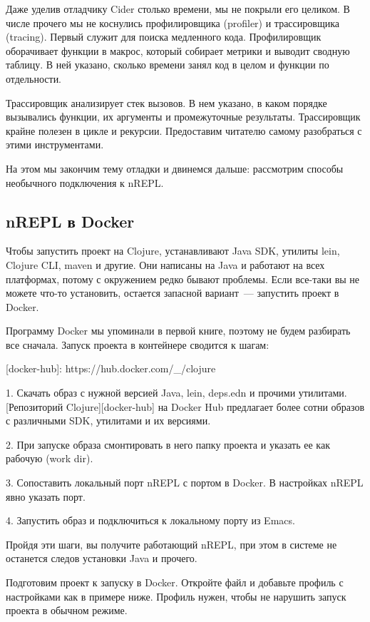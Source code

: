 Даже уделив отладчику Cider столько времени, мы не покрыли его целиком. В числе прочего мы не коснулись профилировщика (profiler) и трассировщика (tracing). Первый служит для поиска медленного кода. Профилировщик оборачивает функции в макрос, который собирает метрики и выводит сводную таблицу. В ней указано, сколько времени занял код в целом и функции по отдельности.

Трассировщик анализирует стек вызовов. В нем указано, в каком порядке вызывались функции, их аргументы и промежуточные результаты. Трассировщик крайне полезен в цикле и рекурсии. Предоставим читателю самому разобраться с этими инструментами.

На этом мы закончим тему отладки и двинемся дальше: рассмотрим способы необычного подключения к nREPL.

\subsection{nREPL в Docker}

Чтобы запустить проект на Clojure, устанавливают Java SDK, утилиты lein, Clojure CLI, maven и другие. Они написаны на Java и работают на всех платформах, потому с окружением редко бывают проблемы. Если все-таки вы не можете что-то установить, остается запасной вариант~--- запустить проект в Docker.

Программу Docker мы упоминали в первой книге, поэтому не будем разбирать все сначала. Запуск проекта в контейнере сводится к шагам:

[docker-hub]: https://hub.docker.com/\_/clojure

1. Скачать образ с нужной версией Java, lein, deps.edn и прочими утилитами. [Репозиторий Clojure][docker-hub] на Docker Hub предлагает более сотни образов с различными SDK, утилитами и их версиями.

2. При запуске образа смонтировать в него папку проекта и указать ее как рабочую (work dir).

3. Сопоставить локальный порт nREPL с портом в Docker. В настройках nREPL явно указать порт.

4. Запустить образ и подключиться к локальному порту из Emacs.

Пройдя эти шаги, вы получите работающий nREPL, при этом в системе не останется следов установки Java и прочего.

Подготовим проект к запуску в Docker. Откройте файл  и добавьте профиль  с настройками как в примере ниже. Профиль нужен, чтобы не нарушить запуск проекта в обычном режиме.

